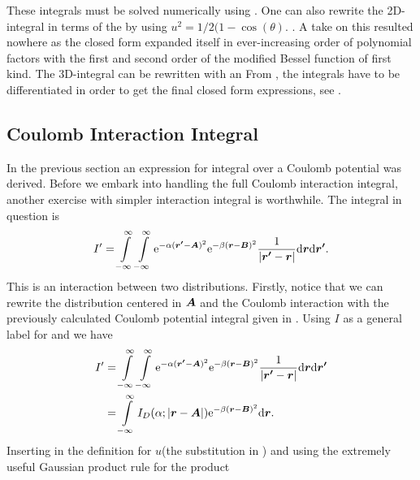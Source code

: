    These integrals must be solved numerically using \cite{gausschebyshev}. One can also rewrite the 2D-integral in
    terms of the  by using
    $u^2=1/2(1 - \cos(\theta)$\cite{modifiedBessel}.
    \cite{HelgakerTaylorGauss}. A take on this resulted nowhere as the closed
    form expanded itself in ever-increasing order of polynomial factors with
    the first and second order of the modified Bessel function of first kind.
    The 3D-integral can be rewritten with an 
    From , the integrals have to be differentiated in
    order to get the final closed form expressions, see .

\subsection{Coulomb Interaction Integral}
    In the previous section an expression for integral over a Coulomb potential
    was derived. Before we embark into handling the full Coulomb interaction
    integral, another exercise with simpler interaction integral is worthwhile.
    The integral in question is
        \begin{equation}
            I' = \int\limits^{\infty}_{-\infty}\int\limits^{\infty}_{-\infty} \mathrm{e}^{-\alpha(\boldsymbol{{r'}}-\boldsymbol{{A}})^2}
            \mathrm{e}^{-\beta(\boldsymbol{{r}}-\boldsymbol{{B}})^2} \frac{1}{\abs{\boldsymbol{{r'}} -
            \boldsymbol{{r}}}} \mathrm{d}\boldsymbol{{r}} \mathrm{d}\boldsymbol{{r'}}.
            \label{eq:coulombInteractionSimple}
        \end{equation}
    This is an interaction between two distributions. Firstly, notice that we
    can rewrite the distribution centered in $\boldsymbol{{A}}$ and the Coulomb
    interaction with the previously calculated Coulomb potential integral given
    in . Using $I$ as a general label for
     and  we have
        \begin{align}
            I' &= \int\limits^{\infty}_{-\infty}\int\limits^{\infty}_{-\infty} \mathrm{e}^{-\alpha(\boldsymbol{{r'}}-\boldsymbol{{A}})^2}
            \mathrm{e}^{-\beta(\boldsymbol{{r}}-\boldsymbol{{B}})^2} \frac{1}{\abs{\boldsymbol{{r'}} -
            \boldsymbol{{r}}}} \mathrm{d}\boldsymbol{{r}} \mathrm{d}\boldsymbol{{r'}} \nonumber \\
            &= \int\limits^{\infty}_{-\infty} I_D(\alpha;\abs{\boldsymbol{{r}}-\boldsymbol{{A}}}) \mathrm{e}^{-\beta(\boldsymbol{{r}}
            - \boldsymbol{{B}})^2} \mathrm{d}\boldsymbol{{r}}.
            \label{eq:Cintr1}
        \end{align}
    Inserting in the definition for $u$(the substitution in )
    and using the extremely useful Gaussian product rule for the product
